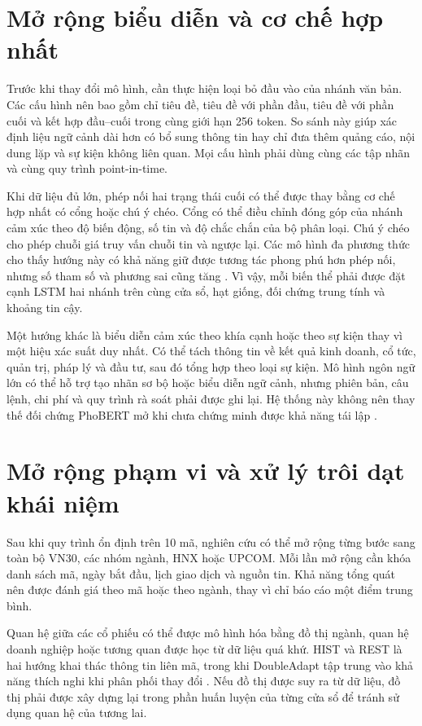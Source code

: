 \documentclass[12pt, a4paper, oneside]{report}
\begin{document}
\section{Mở rộng biểu diễn và cơ chế hợp nhất}

Trước khi thay đổi mô hình, cần thực hiện loại bỏ đầu vào của nhánh văn bản. Các cấu
hình nên bao gồm chỉ tiêu đề, tiêu đề với phần đầu, tiêu đề với phần cuối và kết hợp
đầu--cuối trong cùng giới hạn 256 token. So sánh này giúp xác định liệu ngữ cảnh dài
hơn có bổ sung thông tin hay chỉ đưa thêm quảng cáo, nội dung lặp và sự kiện không liên
quan. Mọi cấu hình phải dùng cùng các tập nhãn và cùng quy trình point-in-time.

Khi dữ liệu đủ lớn, phép nối hai trạng thái cuối có thể được thay bằng cơ chế hợp nhất
có cổng hoặc chú ý chéo. Cổng có thể điều chỉnh đóng góp của nhánh cảm xúc theo độ biến
động, số tin và độ chắc chắn của bộ phân loại. Chú ý chéo cho phép chuỗi giá truy vấn
chuỗi tin và ngược lại. Các mô hình đa phương thức cho thấy hướng này có khả năng giữ
được tương tác phong phú hơn phép nối, nhưng số tham số và phương sai cũng tăng
\cite{Omranpour2024_241210540v1,Elahi2024_241101368v1}. Vì vậy, mỗi biến thể phải được
đặt cạnh LSTM hai nhánh trên cùng cửa sổ, hạt giống, đối chứng trung tính và khoảng tin
cậy.

Một hướng khác là biểu diễn cảm xúc theo khía cạnh hoặc theo sự kiện thay vì một hiệu
xác suất duy nhất. Có thể tách thông tin về kết quả kinh doanh, cổ tức, quản trị, pháp
lý và đầu tư, sau đó tổng hợp theo loại sự kiện. Mô hình ngôn ngữ lớn có thể hỗ trợ tạo
nhãn sơ bộ hoặc biểu diễn ngữ cảnh, nhưng phiên bản, câu lệnh, chi phí và quy trình rà
soát phải được ghi lại. Hệ thống này không nên thay thế đối chứng PhoBERT mở khi chưa
chứng minh được khả năng tái lập
\cite{Liang2024_241210823v2,Siala2026_260200086v3}.

\section{Mở rộng phạm vi và xử lý trôi dạt khái niệm}

Sau khi quy trình ổn định trên 10 mã, nghiên cứu có thể mở rộng từng bước sang toàn bộ
VN30, các nhóm ngành, HNX hoặc UPCOM. Mỗi lần mở rộng cần khóa danh sách mã, ngày bắt
đầu, lịch giao dịch và nguồn tin. Khả năng tổng quát nên được đánh giá theo mã hoặc theo
ngành, thay vì chỉ báo cáo một điểm trung bình.

Quan hệ giữa các cổ phiếu có thể được mô hình hóa bằng đồ thị ngành, quan hệ doanh
nghiệp hoặc tương quan được học từ dữ liệu quá khứ. HIST và REST là hai hướng khai thác
thông tin liên mã, trong khi DoubleAdapt tập trung vào khả năng thích nghi khi phân
phối thay đổi \cite{Xu2021_211013716v2,Xu2021_210207372v2,Zhao2023_230609862v3}. Nếu
đồ thị được suy ra từ dữ liệu, đồ thị phải được xây dựng lại trong phần huấn luyện của
từng cửa sổ để tránh sử dụng quan hệ của tương lai.
\end{document}
